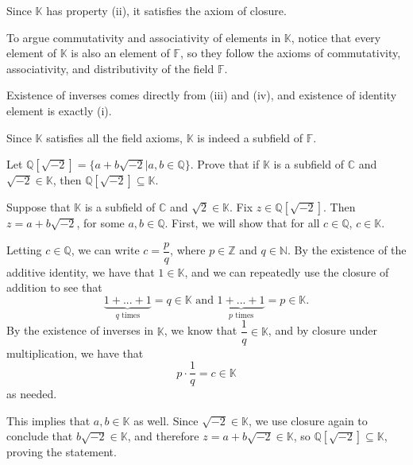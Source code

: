 \documentclass{article}
\theoremstyle{plain} %
\numberwithin{thm}{section} %
\theoremstyle{definition}
\begin{document}
\begin{question}{4}
        Since \(\mathbb{K}\) has property (ii), it satisfies the axiom of closure.

        To argue commutativity and associativity of elements in \(\mathbb{K}\), notice that every element of \(\mathbb{K}\) is also an element of \(\mathbb{F}\), so they follow the axioms of commutativity, associativity, and distributivity of the field \(\mathbb{F}\).

        Existence of inverses comes directly from (iii) and (iv), and existence of identity element is exactly (i).

        Since \(\mathbb{K}\) satisfies all the field axioms, \(\mathbb{K}\) is indeed a subfield of \(\mathbb{F}\).
    \end{question}
    \newpage
    \begin{question}{5}
        Let \(\mathbb{Q}[\sqrt{-2}] = \{a + b\sqrt{-2} | a,b \in \mathbb{Q}\}\). Prove that if \(\mathbb{K}\) is a subfield of \(\mathbb{C}\) and \(\sqrt{-2} \in \mathbb{K}\), then \(\mathbb{Q}[\sqrt{-2}] \subseteq \mathbb{K}\).

        \tcblower

        Suppose that \(\mathbb{K}\) is a subfield of \(\mathbb{C}\) and \(\sqrt{2} \in \mathbb{K}\). Fix \(z \in \mathbb{Q} [\sqrt{-2}]\). Then \(z = a + b\sqrt{-2}\), for some \(a,b \in \mathbb{Q}\). First, we will show that for all \(c \in \mathbb{Q}\), \(c \in \mathbb{K}\).

        \smallbreak

        Letting \(c \in \mathbb{Q}\), we can write \(c = \dfrac{p}{q}\), where \(p \in \mathbb{Z}\) and \(q \in \mathbb{N}\). By the existence of the additive identity, we have that \(1 \in \mathbb{K}\), and we can repeatedly use the closure of addition to see that
        \[
            \underbrace{1 + ... + 1}_{q \text{  times}} = q \in \mathbb{K} \text{ and } \underbrace{1 + ... + 1}_{p \text{  times}} = p \in \mathbb{K}.
        \]
        By the existence of inverses in \(\mathbb{K}\), we know that \(\dfrac{1}{q} \in \mathbb{K}\), and by closure under multiplication, we have that
        \[
            p \cdot \frac{1}{q} = c \in \mathbb{K}
        \]
        as needed.

        \smallbreak

        This implies that \(a,b \in \mathbb{K}\) as well. Since \(\sqrt{-2} \in \mathbb{K}\), we use closure again to conclude that \(b\sqrt{-2} \in \mathbb{K}\), and therefore \(z = a + b\sqrt{-2} \in \mathbb{K}\), so \(\mathbb{Q}[\sqrt{-2}] \subseteq \mathbb{K}\), proving the statement.
    \end{question}
\end{document}
